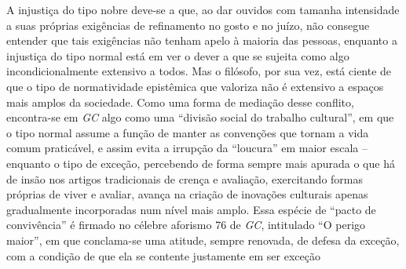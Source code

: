 \documentclass[
	12pt,				%
	openright,			%
	oneside,			%
	a4paper,			%
	english,			%
	french,				%
	spanish,			%
	brazil				%
	]{abntex2}
\begin{document}
A injustiça do tipo nobre deve-se a que, ao dar ouvidos com tamanha intensidade a suas próprias exigências de refinamento no gosto e no juízo, não consegue entender que tais exigências não tenham apelo à maioria das pessoas, enquanto a injustiça do tipo normal está em ver o dever a que se sujeita como algo incondicionalmente extensivo a todos. Mas o filósofo, por sua vez, está ciente de que o tipo de normatividade epistêmica que valoriza não é extensivo a espaços mais amplos da sociedade. Como uma forma de mediação desse conflito, encontra-se em \textit{GC} algo como uma “divisão social do trabalho cultural”, em que o tipo normal assume a função de manter as convenções que tornam a vida comum praticável, e assim evita a irrupção da “loucura” em maior escala – enquanto o tipo de exceção, percebendo de forma sempre mais apurada o que há de insão nos artigos tradicionais de crença e avaliação, exercitando formas próprias de viver e avaliar, avança na criação de inovações culturais apenas gradualmente incorporadas num nível mais amplo. Essa espécie de “pacto de convivência” é firmado no célebre aforismo 76 de \textit{GC}, intitulado “O perigo maior”, em que conclama-se uma atitude, sempre renovada, de defesa da exceção, com a condição de que ela se contente justamente em ser exceção
\end{document}
